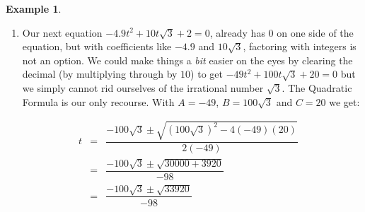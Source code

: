 \documentclass[11pt]{article}
\theoremstyle{definition}  %
\newtheorem{ex}{\bf Example}
\begin{document}
\begin{ex}
\begin{enumerate}
\[\begin{array}{rclr}
100x^2 - 420x + 441 & = & 0 & \text{Gather like terms} \\  

\end{array} \]

With highly composite numbers like $100$ and $441$, factoring seems inefficient at best,\footnote{This is actually the Perfect Square Trinomial $(10x - 21)^2$.} so we apply the Quadratic Formula with $A = 100$, $B = -420$ and $C = 441$:\[ \begin{array}{rclr}

x & = & \dfrac{-(-420) \pm \sqrt{(-420)^2 - 4(100)(441)}}{2(100)} & \\ [12pt]

 & = & \dfrac{420 \pm \sqrt{176000 - 176400}}{200} & \\ [12pt]

& = & \dfrac{420 \pm \sqrt{0}}{200} & \\ [12pt]

& = & \dfrac{420 \pm 0}{200} & \\ [12pt]
& = & \dfrac{420}{200} & \\ [12pt]

& = & \dfrac{21}{10} & \\

\end{array} \]

To our surprise and delight we obtain just one answer, $x = \frac{21}{10}$.

\item  Our next equation $-4.9t^2 + 10t\sqrt{3} + 2 = 0$, already has $0$ on one side of the equation, but with coefficients like $-4.9$ and $10\sqrt{3}$, factoring with integers is not an option.  We could make things a \textit{bit} easier on the eyes by clearing the decimal (by multiplying through by $10$) to get  $-49t^2 + 100t\sqrt{3} + 20 = 0$ but we simply cannot rid ourselves of the irrational number $\sqrt{3}$.  The Quadratic Formula is our only recourse.  With $A = -49$, $B = 100\sqrt{3}$ and $C = 20$ we get: 

\[ \begin{array}{rclr}

t & = &  \dfrac{-100\sqrt{3} \pm \sqrt{(100\sqrt{3})^2 - 4(-49)(20)}}{2(-49)} & \\ [10pt]

& = &  \dfrac{-100\sqrt{3} \pm \sqrt{30000 +3920}}{-98}  & \\ [10pt]

& = &  \dfrac{-100\sqrt{3} \pm \sqrt{33920}}{-98}  & \\ [10pt]


\end{array}\]
\end{enumerate}
\end{ex}
\end{document}

